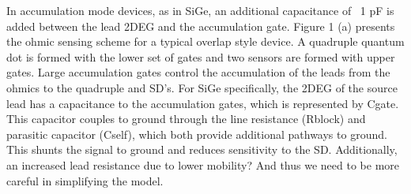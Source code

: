 \documentclass{article}
\begin{document}
	\color{blue}In accumulation mode devices, as in SiGe, \color{black} an additional capacitance of ~1 pF is added between the lead 2DEG and the accumulation gate.  Figure 1 (a) presents the ohmic sensing scheme for a typical overlap style device.  A quadruple quantum dot is formed with the lower set of gates and two sensors are formed with upper gates.  Large accumulation gates control the accumulation of the leads from the ohmics to the quadruple and SD’s.  For SiGe specifically, the 2DEG of the source lead has a capacitance to the accumulation gates, which is represented by Cgate. This capacitor couples to ground through the line resistance (Rblock) and parasitic capacitor (Cself), which both provide additional pathways to ground. This shunts the signal to ground and reduces sensitivity to the SD. \color{blue} Additionally, an increased lead resistance due to lower mobility? And thus we need to be more careful in simplifying the model. \color{black}

\end{document}
